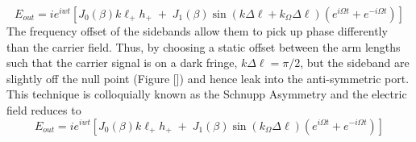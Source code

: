 		\begin{equation}
		E_{out} = i e^{iwt} [ J_0(\beta) 	k \ell_{+}  h_{+}  \; + \; J_1(\beta) \sin( k \Delta \ell + k_{\Omega} \Delta \ell) (e^{i\Omega t}  + e^{-i\Omega t}) ]
		\end{equation}
		The frequency offset of the sidebands allow them to pick up phase differently than the carrier field. Thus, by choosing a static offset between the arm lengths such that the carrier signal is on a dark fringe, $k \Delta \ell = \pi/2$, but the sideband are slightly off the null point (Figure []) and hence leak into the anti-symmetric port.  This technique is colloquially known as the Schnupp Asymmetry and the electric field reduces to
		\begin{equation}
		E_{out} = i e^{iwt} [ J_0(\beta) 	k \ell_{+}  h_{+}  \; + \; J_1(\beta) \sin(k_{\Omega} \Delta \ell) ( e^{i\Omega t} + e^{-i\Omega t}) ]
		\end{equation}
		
